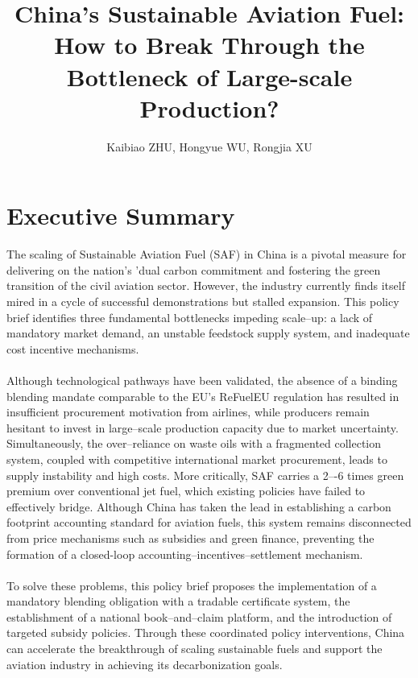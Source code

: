 \documentclass[a4paper,11pt]{article}
\title{\color{schoolblue}\textbf{China's Sustainable Aviation Fuel: How to Break Through the Bottleneck of Large-scale Production?}}
\author{Kaibiao ZHU, Hongyue WU, Rongjia XU}
\date{}
\begin{document}
\maketitle

\section*{Executive Summary}
\begin{tcolorbox}[summarystyle]

The scaling of Sustainable Aviation Fuel (SAF) in China is a pivotal measure for delivering on the nation's 'dual carbon commitment and fostering the green transition of the civil aviation sector. However, the industry currently finds itself mired in a cycle of successful demonstrations but stalled expansion. This policy brief identifies three fundamental bottlenecks impeding scale--up: a lack of mandatory market demand, an unstable feedstock supply system, and inadequate cost incentive mechanisms.\\
\\
Although technological pathways have been validated, the absence of a binding blending mandate comparable to the EU's ReFuelEU regulation has resulted in insufficient procurement motivation from airlines, while producers remain hesitant to invest in large--scale production capacity due to market uncertainty. Simultaneously, the over--reliance on waste oils with a fragmented collection system, coupled with competitive international market procurement, leads to supply instability and high costs. More critically, SAF carries a 2–-6 times green premium over conventional jet fuel, which existing policies have failed to effectively bridge. Although China has taken the lead in establishing a carbon footprint accounting standard for aviation fuels, this system remains disconnected from price mechanisms such as subsidies and green finance, preventing the formation of a closed-loop accounting--incentives--settlement mechanism.\\
\\
To solve these problems, this policy brief proposes the implementation of a mandatory blending obligation with a tradable certificate system, the establishment of a national book--and--claim platform, and the introduction of targeted subsidy policies. Through these coordinated policy interventions, China can accelerate the breakthrough of scaling sustainable fuels and support the aviation industry in achieving its decarbonization goals.
\end{tcolorbox}
\end{document}
